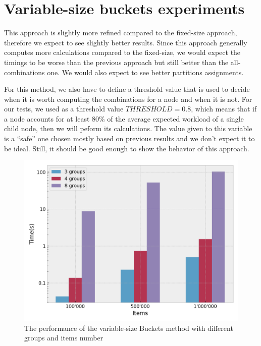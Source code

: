 \section{Variable-size buckets experiments}\label{sec:Variable-Size-buckets-tests}
This approach is slightly more refined compared to the fixed-size approach, therefore we expect to see slightly better results. Since this approach generally computes more calculations compared to the fixed-size, we would expect the timings to be worse than the previous approach but still better than the all-combinations one. We would also expect to see better partitions assignments.

For this method, we also have to define a threshold value that is used to decide when it is worth computing the combinations for a node and when it is not. For our tests, we used as a threshold value $THRESHOLD = 0.8$, which means that if a node accounts for at least 80\% of the average expected workload of a single child node, then we will peform its calculations. The value given to this variable is a ``safe'' one chosen mostly based on previous results and we don't expect it to be ideal. Still, it should be good enough to show the behavior of this approach.

\begin{figure}[!htb]
  \centering
  \includegraphics[width=\textwidth,height=\textheight,keepaspectratio]{img/dynamic.png}
  \caption{The performance of the variable-size Buckets method with different groups and items number}
  \label{fig:dynamic}
\end{figure}

